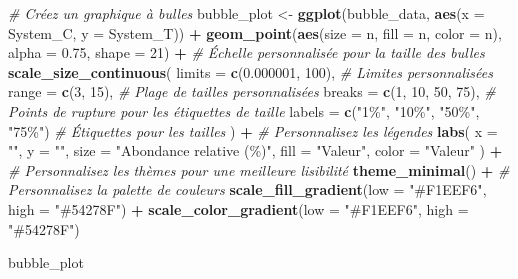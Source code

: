 \documentclass[
]{book}
\newenvironment{Shaded}{\begin{snugshade}}{\end{snugshade}}
\newcommand{\AttributeTok}[1]{\textcolor[rgb]{0.13,0.29,0.53}{#1}}
\newcommand{\CommentTok}[1]{\textcolor[rgb]{0.56,0.35,0.01}{\textit{#1}}}
\newcommand{\DecValTok}[1]{\textcolor[rgb]{0.00,0.00,0.81}{#1}}
\newcommand{\FloatTok}[1]{\textcolor[rgb]{0.00,0.00,0.81}{#1}}
\newcommand{\FunctionTok}[1]{\textcolor[rgb]{0.13,0.29,0.53}{\textbf{#1}}}
\newcommand{\NormalTok}[1]{#1}
\newcommand{\OtherTok}[1]{\textcolor[rgb]{0.56,0.35,0.01}{#1}}
\newcommand{\SpecialCharTok}[1]{\textcolor[rgb]{0.81,0.36,0.00}{\textbf{#1}}}
\newcommand{\StringTok}[1]{\textcolor[rgb]{0.31,0.60,0.02}{#1}}
\begin{document}
\begin{Shaded}
\begin{Highlighting}[]
\CommentTok{\# Créez un graphique à bulles}
\NormalTok{bubble\_plot }\OtherTok{\textless{}{-}} \FunctionTok{ggplot}\NormalTok{(bubble\_data, }\FunctionTok{aes}\NormalTok{(}\AttributeTok{x =}\NormalTok{ System\_C, }\AttributeTok{y =}\NormalTok{ System\_T)) }\SpecialCharTok{+}
  \FunctionTok{geom\_point}\NormalTok{(}\FunctionTok{aes}\NormalTok{(}\AttributeTok{size =}\NormalTok{ n, }\AttributeTok{fill =}\NormalTok{ n, }\AttributeTok{color =}\NormalTok{ n), }\AttributeTok{alpha =} \FloatTok{0.75}\NormalTok{, }\AttributeTok{shape =} \DecValTok{21}\NormalTok{) }\SpecialCharTok{+} 
  \CommentTok{\# Échelle personnalisée pour la taille des bulles}
  \FunctionTok{scale\_size\_continuous}\NormalTok{(}
    \AttributeTok{limits =} \FunctionTok{c}\NormalTok{(}\FloatTok{0.000001}\NormalTok{, }\DecValTok{100}\NormalTok{),  }\CommentTok{\# Limites personnalisées}
    \AttributeTok{range =} \FunctionTok{c}\NormalTok{(}\DecValTok{3}\NormalTok{, }\DecValTok{15}\NormalTok{),           }\CommentTok{\# Plage de tailles personnalisées}
    \AttributeTok{breaks =} \FunctionTok{c}\NormalTok{(}\DecValTok{1}\NormalTok{, }\DecValTok{10}\NormalTok{, }\DecValTok{50}\NormalTok{, }\DecValTok{75}\NormalTok{),  }\CommentTok{\# Points de rupture pour les étiquettes de taille}
    \AttributeTok{labels =} \FunctionTok{c}\NormalTok{(}\StringTok{"1\%"}\NormalTok{, }\StringTok{"10\%"}\NormalTok{, }\StringTok{"50\%"}\NormalTok{, }\StringTok{"75\%"}\NormalTok{)  }\CommentTok{\# Étiquettes pour les tailles}
\NormalTok{  ) }\SpecialCharTok{+} 
  \CommentTok{\# Personnalisez les légendes}
  \FunctionTok{labs}\NormalTok{(}
    \AttributeTok{x =} \StringTok{""}\NormalTok{,}
    \AttributeTok{y =} \StringTok{""}\NormalTok{,}
    \AttributeTok{size =} \StringTok{"Abondance relative (\%)"}\NormalTok{,}
    \AttributeTok{fill =} \StringTok{"Valeur"}\NormalTok{,}
    \AttributeTok{color =} \StringTok{"Valeur"}
\NormalTok{  ) }\SpecialCharTok{+} 
  \CommentTok{\# Personnalisez les thèmes pour une meilleure lisibilité}
  \FunctionTok{theme\_minimal}\NormalTok{() }\SpecialCharTok{+}
  \CommentTok{\# Personnalisez la palette de couleurs}
  \FunctionTok{scale\_fill\_gradient}\NormalTok{(}\AttributeTok{low =} \StringTok{"\#F1EEF6"}\NormalTok{, }\AttributeTok{high =} \StringTok{"\#54278F"}\NormalTok{) }\SpecialCharTok{+}
  \FunctionTok{scale\_color\_gradient}\NormalTok{(}\AttributeTok{low =} \StringTok{"\#F1EEF6"}\NormalTok{, }\AttributeTok{high =} \StringTok{"\#54278F"}\NormalTok{)}

\NormalTok{bubble\_plot}
\end{Highlighting}
\end{Shaded}
\end{document}
